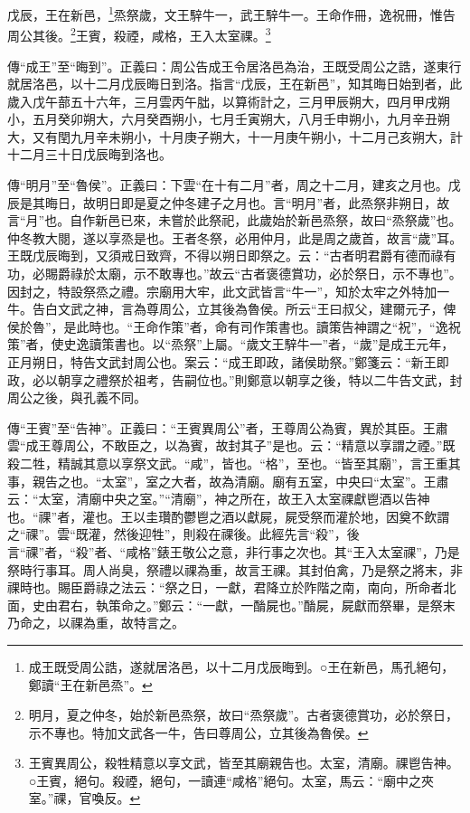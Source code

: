戊辰，王在新邑，\footnote{成王既受周公誥，遂就居洛邑，以十二月戊辰晦到。○王在新邑，馬孔絕句，鄭讀“王在新邑烝”。}烝祭歲，文王騂牛一，武王騂牛一。王命作冊，逸祝冊，惟告周公其後。\footnote{明月，夏之仲冬，始於新邑烝祭，故曰“烝祭歲”。古者褒德賞功，必於祭日，示不專也。特加文武各一牛，告曰尊周公，立其後為魯侯。}王賓，殺禋，咸格，王入太室祼。\footnote{王賓異周公，殺牲精意以享文武，皆至其廟親告也。太室，清廟。祼鬯告神。○王賓，絕句。殺禋，絕句，一讀連“咸格”絕句。太室，馬云：“廟中之夾室。”祼，官喚反。}


{\noindent\zhuan{}\fzbyks 傳“成王”至“晦到”。正義曰：周公告成王令居洛邑為治，王既受周公之誥，遂東行就居洛邑，以十二月戊辰晦日到洛。指言“戊辰，王在新邑”，知其晦日始到者，此歲入戊午蔀五十六年，三月雲丙午朏，以算術計之，三月甲辰朔大，四月甲戌朔小，五月癸卯朔大，六月癸酉朔小，七月壬寅朔大，八月壬申朔小，九月辛丑朔大，又有閏九月辛未朔小，十月庚子朔大，十一月庚午朔小，十二月己亥朔大，計十二月三十日戊辰晦到洛也。 \par}

{\noindent\zhuan{}\fzbyks 傳“明月”至“魯侯”。正義曰：下雲“在十有二月”者，周之十二月，建亥之月也。戊辰是其晦日，故明日即是夏之仲冬建子之月也。言“明月”者，此烝祭非朔日，故言“月”也。自作新邑已來，未嘗於此祭祀，此歲始於新邑烝祭，故曰“烝祭歲”也。仲冬教大閱，遂以享烝是也。王者冬祭，必用仲月，此是周之歲首，故言“歲”耳。王既戊辰晦到，又須戒日致齊，不得以朔日即祭之。云：“古者明君爵有德而祿有功，必賜爵祿於太廟，示不敢專也。”故云“古者褒德賞功，必於祭日，示不專也”。因封之，特設祭烝之禮。宗廟用大牢，此文武皆言“牛一”，知於太牢之外特加一牛。告白文武之神，言為尊周公，立其後為魯侯。所云“王曰叔父，建爾元子，俾侯於魯”，是此時也。“王命作策”者，命有司作策書也。讀策告神謂之“祝”，“逸祝策”者，使史逸讀策書也。以“烝祭”上屬。“歲文王騂牛一”者，“歲”是成王元年，正月朔日，特告文武封周公也。案云：“成王即政，諸侯助祭。”鄭箋云：“新王即政，必以朝享之禮祭於祖考，告嗣位也。”則鄭意以朝享之後，特以二牛告文武，封周公之後，與孔義不同。 \par}

{\noindent\zhuan{}\fzbyks 傳“王賓”至“告神”。正義曰：“王賓異周公”者，王尊周公為賓，異於其臣。王肅雲“成王尊周公，不敢臣之，以為賓，故封其子”是也。云：“精意以享謂之禋。”既殺二牲，精誠其意以享祭文武。“咸”，皆也。“格”，至也。“皆至其廟”，言王重其事，親告之也。“太室”，室之大者，故為清廟。廟有五室，中央曰“太室”。王肅云：“太室，清廟中央之室。”“清廟”，神之所在，故王入太室祼獻鬯酒以告神也。“祼”者，灌也。王以圭瓚酌鬱鬯之酒以獻屍，屍受祭而灌於地，因奠不飲謂之“祼”。雲“既灌，然後迎牲”，則殺在祼後。此經先言“殺”，後言“祼”者，“殺”者、“咸格”錶王敬公之意，非行事之次也。其“王入太室祼”，乃是祭時行事耳。周人尚臭，祭禮以祼為重，故言王祼。其封伯禽，乃是祭之將末，非祼時也。賜臣爵祿之法云：“祭之日，一獻，君降立於阼階之南，南向，所命者北面，史由君右，執策命之。”鄭云：“一獻，一酳屍也。”酳屍，屍獻而祭畢，是祭末乃命之，以祼為重，故特言之。 \par}

